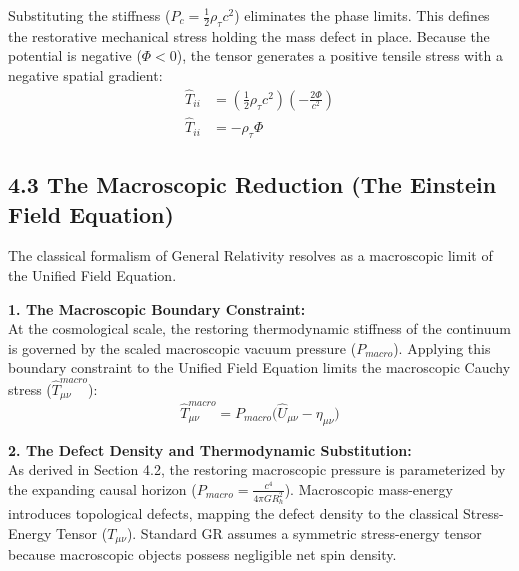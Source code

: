 Substituting the stiffness ($P_c = \frac{1}{2}\rho_\tau c^2$) eliminates the phase limits. This defines the restorative mechanical stress holding the mass defect in place. Because the potential is negative ($\Phi < 0$), the tensor generates a positive tensile stress with a negative spatial gradient: 
\begin{align}
    \hat{T}_{ii} &= \left( \frac{1}{2}\rho_\tau c^2 \right) \left( - \frac{2\Phi}{c^2} \right) \nonumber \\ 
    \hat{T}_{ii} &= - \rho_\tau \Phi \label{eq:spatial_stress_potential} 
\end{align}


\vspace{0.2 cm}



\subsection*{4.3 The Macroscopic Reduction (The Einstein Field Equation)}
\label{sec:deriv_einstein_reduction}
The classical formalism of General Relativity resolves as a macroscopic limit of the Unified Field Equation.

\textbf{1. The Macroscopic Boundary Constraint:} \\
At the cosmological scale, the restoring thermodynamic stiffness of the continuum is governed by the scaled macroscopic vacuum pressure ($P_{macro}$). Applying this boundary constraint to the Unified Field Equation limits the macroscopic Cauchy stress ($\hat{T}^{macro}_{\mu\nu}$):
\begin{equation}
    \hat{T}^{macro}_{\mu\nu} = P_{macro} \Big( \hat{U}_{\mu\nu} - \eta_{\mu\nu} \Big) \label{eq:field_equation_macro}
\end{equation}

\textbf{2. The Defect Density and Thermodynamic Substitution:} \\
As derived in Section 4.2, the restoring macroscopic pressure is parameterized by the expanding causal horizon ($P_{macro} = \frac{c^4}{4\pi G R_h^2}$). Macroscopic mass-energy introduces topological defects, mapping the defect density to the classical Stress-Energy Tensor ($T_{\mu\nu}$). Standard GR assumes a symmetric stress-energy tensor because macroscopic objects possess negligible net spin density.

\vspace{0.2 cm}

